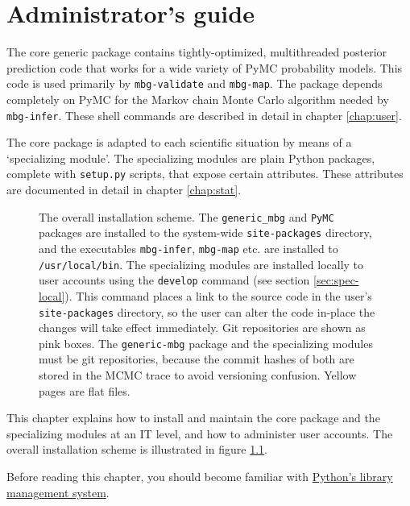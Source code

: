 \chapter{Administrator's guide} 
\label{chap:admin} 

The core generic package contains tightly-optimized, multithreaded posterior prediction code that works for a wide variety of PyMC probability models. This code is used primarily by \texttt{mbg-validate} and \texttt{mbg-map}. The package depends completely on PyMC for the Markov chain Monte Carlo algorithm needed by \texttt{mbg-infer}. These shell commands are described in detail in chapter \ref{chap:user}.

The core package is adapted to each scientific situation by means of a `specializing module'. The specializing modules are plain Python packages, complete with \texttt{setup.py} scripts, that expose certain attributes. These attributes are documented in detail in chapter \ref{chap:stat}.

\begin{figure}[hhh]
    \begin{center}
    \end{center}
    \caption{The overall installation scheme. The \texttt{generic\_mbg} and \texttt{PyMC} packages are installed to the system-wide \texttt{site-packages} directory, and the executables \texttt{mbg-infer}, \texttt{mbg-map} etc. are installed to \texttt{/usr/local/bin}. The specializing modules are installed locally to user accounts using the \texttt{develop} command (see section \ref{sec:spec-local}). This command places a link to the source code in the user's \texttt{site-packages} directory, so the user can alter the code in-place the changes will take effect immediately. Git repositories are shown as pink boxes. The \texttt{generic-mbg} package and the specializing modules must be git repositories, because the commit hashes of both are stored in the MCMC trace to avoid versioning confusion. Yellow pages are flat files.}
    \label{fig:installation}
\end{figure}

\bigskip
This chapter explains how to install and maintain the core package and the specializing modules at an IT level, and how to administer user accounts. The overall installation scheme is illustrated in figure \ref{fig:installation}.

\bigskip
Before reading this chapter, you should become familiar with \href{http://docs.python.org/install/index.html}{Python's library management system}.

